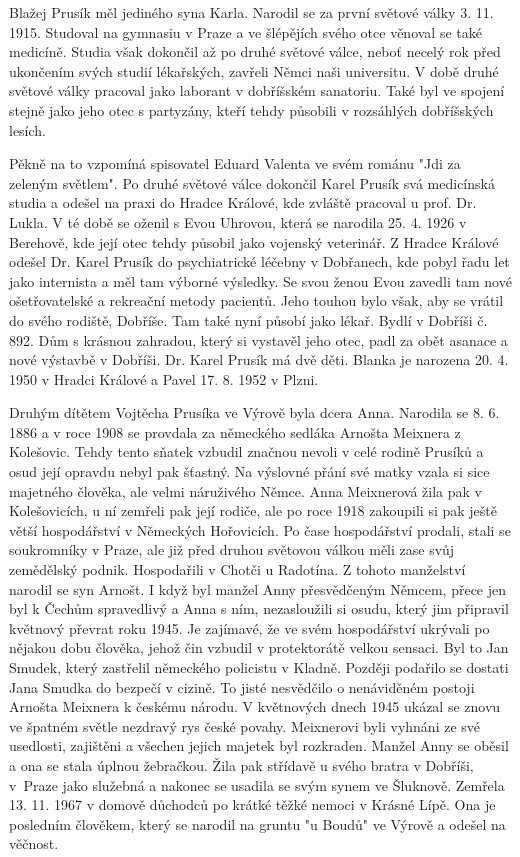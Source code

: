 \documentclass[../dejiny-rodu-prusiku.tex]{subfiles}
\begin{document}
Blažej Prusík měl jediného syna Karla. Narodil se za první světové války 3. 11. 1915. Studoval na gymnasiu v Praze a ve šlépějích svého otce věnoval se také medicí­ně. Studia však dokončil až po druhé světové válce, ne­boť necelý rok před ukončením svých studií lékařských, zavřeli Němci naši universitu. V době druhé světové vál­ky pracoval jako laborant v dobříšském sanatoriu. Také byl ve spojení stejně jako jeho otec s partyzány, kteří tehdy působili v rozsáhlých dobříšských lesích.

Pěkně na to vzpomíná spisovatel Eduard Valenta ve svém románu "Jdi za zeleným světlem". Po druhé světové válce dokončil Karel Prusík svá medicínská studia a odešel na praxi do Hradce Králové, kde zvláště pracoval u prof. Dr. Lukla. V té době se oženil s Evou Uhrovou, která se narodila 25. 4. 1926 v Berehově, kde její otec tehdy působil jako vojen­ský veterinář. Z Hradce Králové odešel Dr. Karel Pru­sík do psychiatrické léčebny v Dobřanech, kde pobyl řadu let jako internista a měl tam výborné výsledky. Se svou ženou Evou zavedli tam nové ošetřovatelské a rekreační metody pacientů. Jeho touhou bylo však, aby se vrátil do svého rodiště, Dobříše. Tam také nyní působí jako lékař. Bydlí v Dobříši č. 892. Dům s krásnou zahradou, který si vystavěl jeho otec, padl za obět asanace a nové výstavbě v Dobříši. Dr. Karel Prusík má dvě děti. Blanka je narozena 20. 4. 1950 v Hradci Králové a Pavel 17. 8. 1952 v Plzni.

Druhým dítětem Vojtěcha Prusíka ve Výrově byla dcera Anna. Narodila se 8. 6. 1886 a v roce 1908 se provdala za německého sedláka Arnošta Meixnera z Kolešovic. Tehdy tento sňatek vzbudil značnou nevoli v celé rodině Prusíků a osud její opravdu nebyl pak šťastný. Na výslovné přání své matky vzala si sice majetného člověka, ale velmi náruživého Němce. Anna Meixnerová žila pak v Kolešovicích, u ní zemřeli pak její rodiče, ale po roce 1918 zakoupili si pak ještě větší hospodář­ství v Německých Hořovicích. Po čase hospodářství pro­dali, stali se soukromníky v Praze, ale již před dru­hou světovou válkou měli zase svůj zemědělský podnik. Hospodařili v Chotči u Radotína. Z tohoto manželství narodil se syn Arnošt. I když byl manžel Anny přesvěd­čeným Němcem, přece jen byl k Čechům spravedlivý a Anna s ním, nezasloužili si osudu, který jim připravil květnový převrat roku 1945. Je zajímavé, že ve svém hospodářství ukrývali po nějakou dobu člověka, jehož čin vzbudil v protektorátě velkou sensaci. Byl to Jan Smudek, který zastřelil německého policistu v Kladně. Později podařilo se dostati Jana Smudka do bezpečí v cizině. To jisté nesvědčilo o nenáviděném postoji Arnošta Meixnera k českému národu. V květnových dnech 1945 uká­zal se znovu ve špatném světle nezdravý rys české pova­hy. Meixnerovi byli vyhnáni ze své usedlosti, zajiště­ni a všechen jejich majetek byl rozkraden. Manžel Anny se oběsil a ona se stala úplnou žebračkou. Žila pak stří­davě u svého bratra v Dobříši, v Praze jako služebná a nakonec se usadila se svým synem ve Šluknově. Zemřela 13. 11. 1967 v domově důchodců po krátké těžké nemoci v Krásné Lípě. Ona je posledním člověkem, který se naro­dil na gruntu "u Boudů" ve Výrově a odešel na věčnost.
\end{document}
